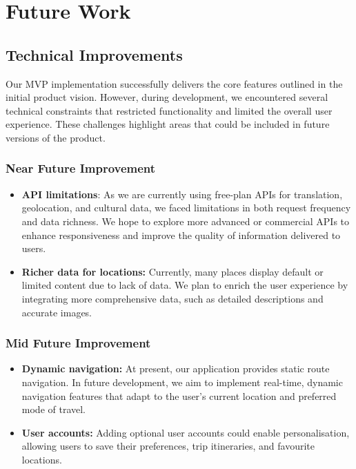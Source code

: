 \chapter{Future Work}
\section{Technical Improvements}
Our MVP implementation successfully delivers the core features outlined in the initial product vision. However, during development, we encountered several technical constraints that restricted functionality and limited the overall user experience. These challenges highlight areas that could be included in future versions of the product.

\subsection{Near Future Improvement}
    \begin{itemize}
        \item \textbf{API limitations}: As we are currently using free-plan APIs for translation, geolocation, and cultural data, we faced limitations in both request frequency and data richness. We hope to explore more advanced or commercial APIs to enhance responsiveness and improve the quality of information delivered to users.
        \item \textbf{Richer data for locations:} Currently, many places display default or limited content due to lack of data. We plan to enrich the user experience by integrating more comprehensive data, such as detailed descriptions and accurate images.  
    \end{itemize}

\subsection{Mid Future Improvement}
    \begin{itemize}
        \item \textbf{Dynamic navigation:} At present, our application provides static route navigation. In future development, we aim to implement real-time, dynamic navigation features that adapt to the user’s current location and preferred mode of travel.
        \item \textbf{User accounts:} Adding optional user accounts could enable personalisation, allowing users to save their preferences, trip itineraries, and favourite locations.
    \end{itemize}

